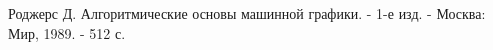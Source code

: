 \documentclass[a4paper,14pt, unknownkeysallowed]{extreport}
\begin{document}


\begin{thebibliography}{9}
	Роджерс Д. Алгоритмические основы машинной графики. - 1-е изд. - Москва: Мир, 1989. - 512 с.
	
	
\end{thebibliography}

\end{document}
